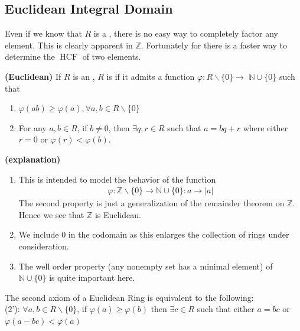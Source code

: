 \documentclass{article}
\newcommand{\bfs}[1]{\textbf{({#1}) }}
\newcommand{\HCF}{\operatorname{HCF}}
\begin{document}
\subsection{Euclidean Integral Domain}

Even if we know that $R$ is a , there is no easy way to completely factor any element. This is clearly apparent in $\mathbb{Z}$. Fortunately for  there is a faster way to determine the $\HCF$ of two elements.

\begin{defa}\bfs{Euclidean}
If $R$ is an , $R$ is  if it admits a function $\varphi: R \backslash\{0\} \rightarrow$ $\mathbb{N} \cup\{0\}$ such that
\begin{enumerate}[(1)]
    \item $\varphi(a b) \geq \varphi(a), \forall a, b \in R \backslash\{0\}$
    \item For any $a, b \in R$, if $b \neq 0$, then $\exists q, r \in R$ such that $a=b q+r$ where either $r=0$ or $\varphi(r)<\varphi(b)$.
\end{enumerate}
\end{defa} 
\begin{rema}\bfs{explanation}
\begin{enumerate}
    \item This is intended to model the behavior of the function
\begin{align*}
\varphi: \mathbb{Z} \backslash\{0\} \rightarrow \mathbb{N} \cup\{0\}: a \rightarrow|a|
\end{align*}
The second property is just a generalization of the remainder theorem on $\mathbb{Z}$. Hence we see that $\mathbb{Z}$ is Euclidean.
\item  We include 0 in the codomain as this enlarges the collection of rings under consideration.
\item The well order property (any nonempty set has a minimal element) of $\mathbb{N} \cup\{0\}$ is quite important here.
\end{enumerate}

\end{rema} 
\begin{lema}
The second axiom of a Euclidean Ring is equivalent to the following:\\
(2'): $\forall a, b \in R \backslash\{0\}$, if $\varphi(a) \geq \varphi(b)$ then $\exists c \in R$ such that either $a=b c$ or $\varphi(a-b c)<\varphi(a)$
\end{lema}
\end{document}
